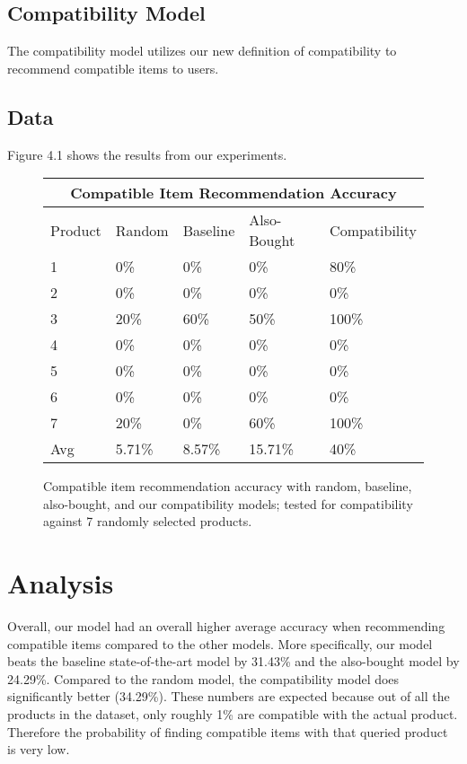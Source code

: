 \subsection{Compatibility Model}
The compatibility model utilizes our new definition of compatibility to recommend compatible items to users.

\subsection{Data}
Figure 4.1 shows the results from our experiments.
\begin{figure}[h!]
    \begin{tabular}{ |p{2cm}|p{2.5cm}|p{2.5cm}|p{2.5cm}|p{2.5cm}| }
     \hline
     \multicolumn{5}{|c|}{Compatible Item Recommendation Accuracy} \\
     \hline
     Product & Random & Baseline & Also-Bought & Compatibility \\
     \hline
     1 & 0\% & 0\% & 0\% & 80\% \\
     2 & 0\% & 0\% & 0\% & 0\% \\
     3 & 20\% & 60\% & 50\% & 100\% \\
     4 & 0\% & 0\% & 0\% & 0\% \\
     5 & 0\% & 0\% & 0\% & 0\% \\
     6 & 0\% & 0\% & 0\% & 0\% \\
     7 & 20\% & 0\% & 60\% & 100\% \\
     \hline
     Avg & 5.71\% & 8.57\% & 15.71\% & 40\% \\
     \hline
    \end{tabular}
    \caption{Compatible item recommendation accuracy with random, baseline, also-bought, and our compatibility models; tested for compatibility against 7 randomly selected products.}
\end{figure}

\section{Analysis}
Overall, our model had an overall higher average accuracy when recommending compatible items compared to the other models. More specifically, our model beats the baseline state-of-the-art model by 31.43\% and the also-bought model by 24.29\%.  Compared to the random model, the compatibility model does significantly better (34.29\%). These numbers are expected because out of all the products in the dataset, only roughly 1\% are compatible with the actual product. Therefore the probability of finding compatible items with that queried product is very low.


